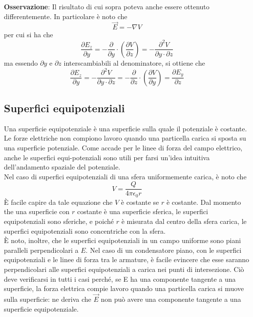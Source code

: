 \documentclass[a4paper]{extarticle}
\begin{document}
\vspace{1em}
\noindent
\textbf{Osservazione}: Il risultato di cui sopra poteva anche essere ottenuto differentemente. In particolare è noto che
\[\vec E = - \nabla V\]
per cui si ha che
\[\frac{\partial E_z}{\partial y} = -\frac{\partial}{\partial y} \cdot \left(\frac{\partial V}{\partial z}\right) = - \frac{\partial^2 V}{\partial y \cdot \partial z}\]
ma essendo $\partial y$ e $\partial z$ interscambiabili al denominatore, si ottiene che
\[\frac{\partial E_z}{\partial y} = - \frac{\partial^2 V}{\partial y \cdot \partial z} = -\frac{\partial}{\partial z} \cdot \left(\frac{\partial V}{\partial y}\right) = \frac{\partial E_y}{\partial z}\]

\vspace{1em}
\subsection{Superfici equipotenziali}
Una superficie equipotenziale è una superficie sulla quale il potenziale è costante. Le forze elettriche non compiono lavoro quando una particella carica si sposta su una superficie potenziale. Come accade per le linee di forza del campo elettrico, anche le superfici equi-potenziali sono utili per farsi un'idea intuitiva dell'andamento spaziale del potenziale.\\
Nel caso di superfici equipotenziali di una sfera uniformemente carica, è noto che
\[V=\frac{Q}{4 \pi \epsilon_0 r}\]
È facile capire da tale equazione che $V$ è costante se $r$ è costante. Dal momento the una superficie con $r$ costante è una superficie sferica, le superfici equipotenziali sono sferiche, e poiché $r$ è misurata dal centro della sfera carica, le superfici equipotenziali sono concentriche con la sfera.\\
È noto, inoltre, che le superfici equipotenziali in un campo uniforme sono piani paralleli perpendicolari a $E$. Nel caso di un condensatore piano, con le superfici equipotenziali e le linee di forza tra le armature, è facile evincere che esse saranno perpendicolari alle superfici equipotenziali a carica nei punti di intersezione. Ciò deve verificarsi in tutti i casi perché, se E ha una componente tangente a una superficie, la forza elettrica compie lavoro quando una particella carica si muove sulla superficie: ne deriva che $\vec E$ non può avere una componente tangente a una superficie equipotenziale.

\vspace{1em}
\noindent
\end{document}
